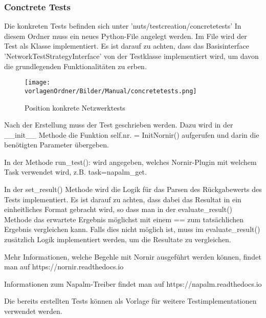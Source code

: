 \documentclass[]{subfiles}
\begin{document}
	\subsubsection{Conctrete Tests}
		Die konkreten Tests befinden sich unter 'nuts/testcreation/concretetests'
		In diesem Ordner muss ein neues Python-File angelegt werden.
		Im File wird der Test als Klasse implementiert.
		Es ist darauf zu achten, dass das Basisinterface 'NetworkTestStrategyInterface' 
		von der Testklasse implementiert wird, um davon die grundlegenden Funktionalitäten
		zu erben.

		\begin{figure}[h!]
			\begin{center}
				\texttt{[image: \\vorlagenOrdner/Bilder/Manual/concretetests.png]}
				\caption{Position konkrete Netzwerktests}
			\end{center}
		\end{figure}

		Nach der Erstellung muss der Test geschrieben werden.
		Dazu wird in der \_\_init\_\_ Methode die Funktion self.nr. = InitNornir() aufgerufen
		und darin die benötigten Parameter übergeben.

		In der Methode run\_test(): wird angegeben, welches Nornir-Plugin mit welchem Task
		verwendet wird, z.B. task=napalm\_get.
		
		In der set\_result() Methode wird die Logik für das Parsen des Rückgabewerts des Tests
		implementiert. 
		Es ist darauf zu achten, dass dabei das Resultat in ein einheitliches Format gebracht 
		wird, so dass man in der evaluate\_result() Methode das erwartete Ergebnis möglichst 
		mit einem == zum tatsächlichen Ergebnis vergleichen kann.
		Falls dies nicht möglich ist, muss im evaluate\_result() zusätzlich Logik implementiert
		werden, um die Resultate zu vergleichen.

		Mehr Informationen, welche Begehle mit Nornir ausgeführt werden können, findet man 
		auf https://nornir.readthedocs.io

		Informationen zum Napalm-Treiber findet man auf https://napalm.readthedocs.io

		Die bereits erstellten Tests können als Vorlage für weitere Testimplementationen verwendet 
		werden.
		
\end{document}
